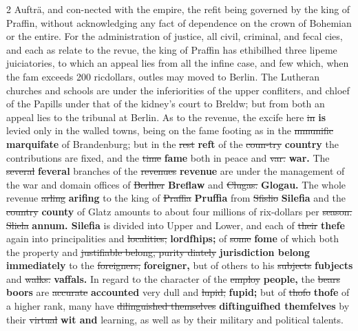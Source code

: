 \documentclass[10pt]{article}
\begin{document}
\begin{multicols}{2}
Aufträ, and con-nected with the empire, the refit being governed by the king of Praffin, without acknowledging any fact of dependence on the crown of Bohemian or the entire. For the administration of justice, all civil, criminal, and fecal cies, and each as relate to the revue, the king of Praffin has ethibilhed three lipeme juiciatories, to which an appeal lies from all the infine case, and few which, when the fam exceeds 200 ricdollars, outles may moved to Berlin. The Lutheran churches and schools are under the inferiorities of the upper confliters, and chloef of the Papills under that of the kidney's court to Breldw; but from both an appeal lies to the tribunal at Berlin. As to the revenue, the excife here \sout{in} \textbf{is} levied only in the walled towns, being on the fame footing as in the \sout{mmunific} \textbf{marquifate} of Brandenburg; but in the \sout{rest} \textbf{reft} of the \sout{coun-try} \textbf{country} the contributions are fixed, and the \sout{time} \textbf{fame} both in peace and \sout{var.} \textbf{war.} The \sout{several} \textbf{feveral} branches of the \sout{revenues} \textbf{revenue} are under the management of the war and domain offices of \sout{Berlher} \textbf{Breflaw} and \sout{Clugas.} \textbf{Glogau.} The whole revenue \sout{arling} \textbf{arifing} to the king of \sout{Praffia} \textbf{Pruffia} from \sout{Sfislio} \textbf{Silefia} and the \sout{country} \textbf{county} of Glatz amounts to about four millions of rix-dollars per \sout{season. Sliela} \textbf{annum. Silefia} is divided into Upper and Lower, and each of \sout{their} \textbf{thefe} again into principalities and \sout{localities;} \textbf{lordfhips;} of \sout{some} \textbf{fome} of which both the property and \sout{justifiable belong, purity diately} \textbf{jurisdiction belong immediately} to the \sout{foreigners,} \textbf{foreigner,} but of others to his \sout{subjects} \textbf{fubjects} and \sout{walks.} \textbf{vaffals.} In regard to the character of the \sout{employ} \textbf{people,} the \sout{bears} \textbf{boors} are \sout{accurate} \textbf{accounted} very dull and \sout{lupid;} \textbf{fupid;} but of \sout{thofo} \textbf{thofe} of a higher rank, many have \sout{dilinguished themselves} \textbf{diftinguifhed themfelves} by their \sout{virtual} \textbf{wit and} learning, as well as by their military and political talents.


\end{multicols}
\end{document}
